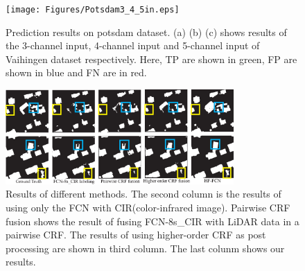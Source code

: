 \begin{figure}
\vspace{-0.2cm}
\centering
\texttt{[image: Figures/Potsdam3\_4\_5in.eps]}
\caption{Prediction results on potsdam dataset. (a) (b) (c) shows results of the 3-channel input, 4-channel input and 5-channel input of Vaihingen dataset respectively. Here, TP are shown in green, FP are shown in blue and FN are in red.}
\label{fig:Potsdam-3-4-5in-visi}
\end{figure}

\begin{figure}
\vspace{-0.2cm}
\centering
\includegraphics[width=8.7cm]{Figures/Potsdam_compared_results.eps}
\caption{Results of different methods. The second column is the results of using only the FCN with CIR(color-infrared image). Pairwise CRF fusion shows the result of fusing FCN-8s\_CIR with LiDAR data in a pairwise CRF. The results of using higher-order CRF\cite{IEEEexample:liu2017dense} as post processing are shown in third column. The last colunm shows our results.}
\label{fig:Potsdam-compared-others}
\end{figure}
